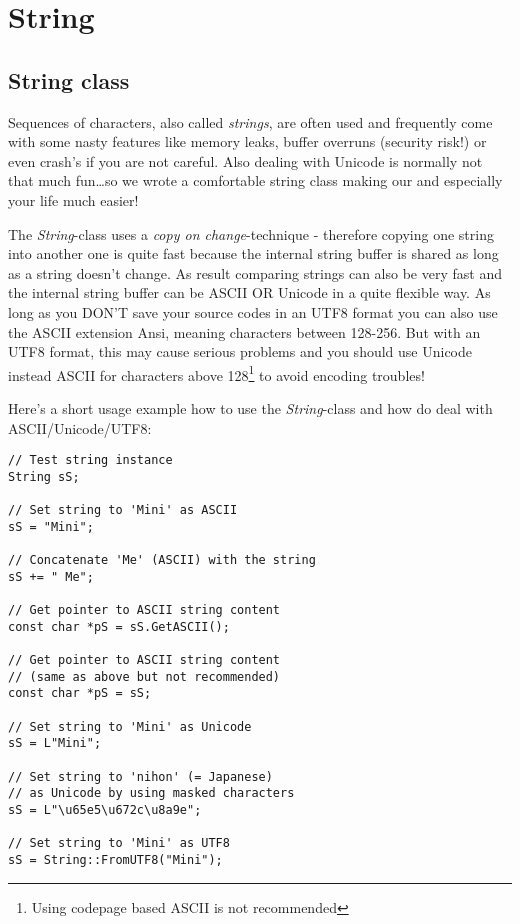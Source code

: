 \chapter{String}




\section{String class}
Sequences of characters, also called \emph{strings}, are often used and frequently come with some nasty features like memory leaks, buffer overruns (security risk!) or even crash's if you are not careful. Also dealing with Unicode is normally not that much fun\ldots so we wrote a comfortable string class making our and especially your life much easier!

The \emph{String}-class uses a \emph{copy on change}-technique - therefore copying one string into another one is quite fast because the internal string buffer is shared as long as a string doesn't change. As result comparing strings can also be very fast and the internal string buffer can be ASCII OR Unicode in a quite flexible way. As long as you DON'T save your source codes in an UTF8 format you can also use the ASCII extension Ansi, meaning characters between 128-256. But with an UTF8 format, this may cause serious problems and you should use Unicode instead ASCII for characters above 128\footnote{Using codepage based ASCII is not recommended} to avoid encoding troubles!

Here's a short usage example how to use the \emph{String}-class and how do deal with ASCII/Unicode/UTF8:

\begin{lstlisting}[caption=ASCII/Unicode/UTF8 string example]
// Test string instance
String sS;

// Set string to 'Mini' as ASCII
sS = "Mini";

// Concatenate 'Me' (ASCII) with the string
sS += " Me";

// Get pointer to ASCII string content
const char *pS = sS.GetASCII();

// Get pointer to ASCII string content
// (same as above but not recommended)
const char *pS = sS;

// Set string to 'Mini' as Unicode
sS = L"Mini";

// Set string to 'nihon' (= Japanese)
// as Unicode by using masked characters
sS = L"\u65e5\u672c\u8a9e";

// Set string to 'Mini' as UTF8
sS = String::FromUTF8("Mini");
\end{lstlisting}


